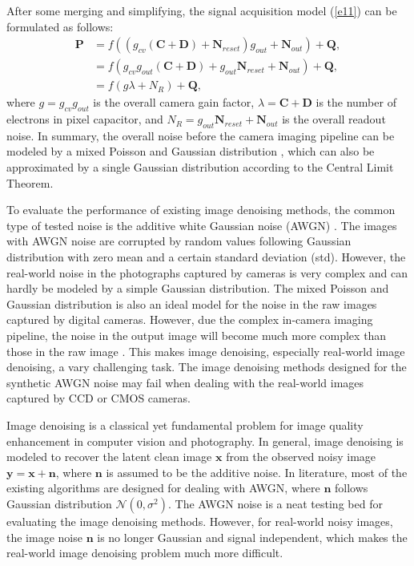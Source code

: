 After some merging and simplifying, the signal acquisition model (\ref{e11}) can be formulated as follows:
\begin{equation}
\label{e12}
\begin{split}
\textbf{P} 
&=f((g_{cv}(\textbf{C}+\textbf{D})+\textbf{N}_{reset})g_{out}+\textbf{N}_{out})+\textbf{Q},
\\
&=f(g_{cv}g_{out}(\textbf{C}+\textbf{D})+g_{out}\textbf{N}_{reset}+\textbf{N}_{out})+\textbf{Q},
\\
&=f(g\lambda+N_{R})+\textbf{Q},
\end{split}
\end{equation}
where $g = g_{cv}g_{out}$ is the overall camera gain factor, $\lambda=\textbf{C}+\textbf{D}$ is the number of electrons in pixel capacitor, and $N_{R}=g_{out}\textbf{N}_{reset}+\textbf{N}_{out}$ is the overall readout noise. In summary, the overall noise before the camera imaging pipeline can be modeled by a mixed Poisson and Gaussian distribution \cite{Foipractical}, which can also be approximated by a single Gaussian distribution according to the Central Limit Theorem.

To evaluate the performance of existing image denoising methods, the common type of tested noise is the additive white Gaussian noise (AWGN) \cite{bm3d,ksvd}. The images with AWGN noise are corrupted by random values following Gaussian distribution with zero mean and a certain standard deviation (std). However, the real-world noise in the photographs captured by cameras is very complex and can hardly be modeled by a simple Gaussian distribution. The mixed Poisson and Gaussian distribution \cite{Foipractical} is also an ideal model for the noise in the raw images captured by digital cameras. However, due the complex in-camera imaging pipeline, the noise in the output image will become much more complex than those in the raw image \cite{crosschannel2016,karaimer_brown_ECCV_2016}. This makes image denoising, especially real-world image denoising, a vary challenging task. The image denoising methods designed for the synthetic AWGN noise may fail when dealing with the real-world images captured by CCD or CMOS cameras.


Image denoising is a classical yet fundamental problem for image quality enhancement in computer vision and photography. In general, image denoising is modeled to recover the latent clean image $\bm{x}$ from the observed noisy image $\bm{y}=\bm{x}+\bm{n}$, where $\bm{n}$ is assumed to be the additive noise. In literature, most of the existing algorithms are designed for dealing with AWGN, where $\bm{n}$ follows Gaussian distribution $\mathcal{N}(0,\sigma^{2})$. The AWGN noise is a neat testing bed for evaluating the image denoising methods. However, for real-world noisy images, the image noise $\bm{n}$ is no longer Gaussian and signal independent, which makes the real-world image denoising problem much more difficult.


